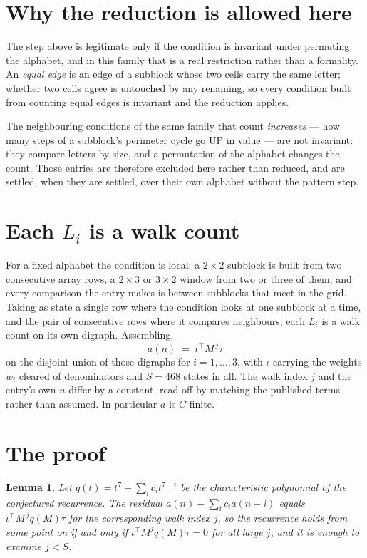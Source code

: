 \documentclass[11pt,a4paper]{article}
\theoremstyle{plain}
\newtheorem{lemma}[theorem]{Lemma}
\theoremstyle{definition}
\begin{document}
\section{Why the reduction is allowed here}

The step above is legitimate only if the condition is invariant under permuting the alphabet,
and in this family that is a real restriction rather than a formality. An \emph{equal edge}
is an edge of a subblock whose two cells carry the same letter; whether two cells agree is
untouched by any renaming, so every condition built from counting equal edges is invariant and
the reduction applies.

The neighbouring conditions of the same family that count \emph{increases} --- how many steps
of a subblock's perimeter cycle go UP in value --- are not invariant: they compare letters by
size, and a permutation of the alphabet changes the count. Those entries are therefore excluded
here rather than reduced, and are settled, when they are settled, over their own alphabet
without the pattern step.

\section{Each $L_i$ is a walk count}

For a fixed alphabet the condition is local: a $2\times2$ subblock is built from two
consecutive array rows, a $2\times3$ or $3\times2$ window from two or three of them, and every
comparison the entry makes is between subblocks that meet in the grid. Taking as state a single
row where the condition looks at one subblock at a time, and the pair of consecutive rows where
it compares neighbours, each $L_i$ is a walk count on its own digraph. Assembling,
\[
a(n)\;=\;\iota^{\!\top}M^{\,j}\tau
\]
on the disjoint union of those digraphs for $i=1,\dots,3$, with $\iota$ carrying the weights
$w_i$ cleared of denominators and $S=468$ states in all. The walk index $j$ and the entry's own
$n$ differ by a constant, read off by matching the published terms rather than assumed. In
particular $a$ is $C$-finite.

\section{The proof}

\begin{lemma}\label{lem:crit}
Let $q(t)=t^{7}-\sum_i c_it^{7-i}$ be the characteristic polynomial of the
conjectured recurrence. The residual $a(n)-\sum_ic_ia(n-i)$ equals
$\iota^{\!\top}M^{\,j}q(M)\tau$ for the corresponding walk index $j$, so the recurrence
holds from some point on if and only if $\iota^{\!\top}M^{j}q(M)\tau=0$ for all large $j$,
and it is enough to examine $j<S$.
\end{lemma}
\end{document}
